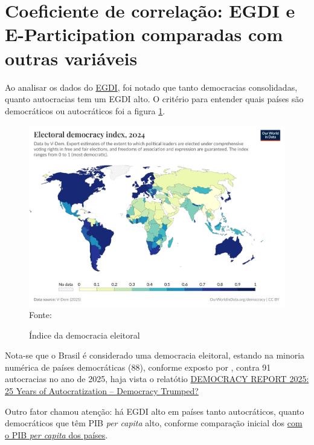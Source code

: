 \section{Coeficiente de correlação: EGDI e E-Participation comparadas com outras variáveis}

Ao analisar os dados do \href{https://publicadministration.un.org/egovkb/en-us/About/Overview/-E-Government-Development-Index}{EGDI}, foi notado que tanto democracias consolidadas, quanto autocracias tem um EGDI alto. O critério para entender quais países são democráticos ou autocráticos foi a figura \ref{fig:electoral-democracy-index}. 

\begin{figure}[H]
	\centering
	\caption{Índice da democracia eleitoral}
	\includegraphics[width=1\linewidth]{figuras/democracia/electoral-democracy-index.png}
	\label{fig:electoral-democracy-index}
	\footnotesize{Fonte: \cite{electoral_democracy_index}}
\end{figure}

Nota-se que o Brasil é considerado uma democracia eleitoral, estando na minoria numérica de países democráticas (88), conforme exposto por \cite{nord2025democracy}, contra 91 autocracias no ano de 2025, haja vista o relatótio \href{https://www.v-dem.net/documents/60/V-dem-dr__2025_lowres.pdf}{DEMOCRACY REPORT 2025: 25 Years of Autocratization – Democracy Trumped?}

Outro fator chamou atenção: há EGDI alto em países tanto autocráticos, quanto democráticos que têm PIB \textit{per capita} alto, conforme comparação inicial dos \href{https://data.worldbank.org/indicator/NY.GDP.PCAP.PP.KD}{com o PIB \textit{per capita} dos países}. 

